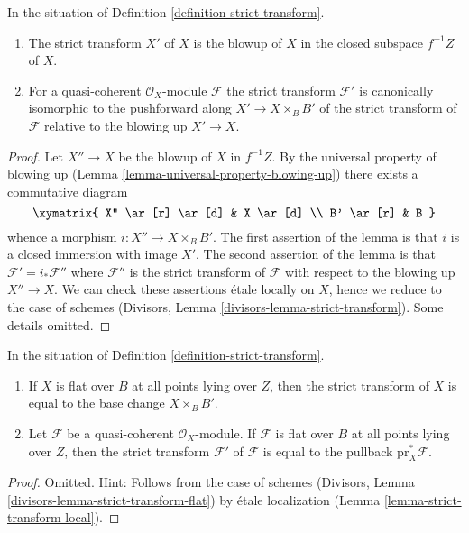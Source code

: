 \begin{lemma}
\label{lemma-strict-transform}
In the situation of Definition \ref{definition-strict-transform}.
\begin{enumerate}
\item The strict transform $X'$ of $X$ is the blowup of $X$ in the closed
subspace $f^{-1}Z$ of $X$.
\item For a quasi-coherent $\mathcal{O}_X$-module $\mathcal{F}$ the
strict transform $\mathcal{F}'$ is canonically isomorphic to
the pushforward along $X' \to X \times_B B'$ of the strict transform of
$\mathcal{F}$ relative to the blowing up $X' \to X$.
\end{enumerate}
\end{lemma}

\begin{proof}
Let $X'' \to X$ be the blowup of $X$ in $f^{-1}Z$. By the universal
property of blowing up (Lemma \ref{lemma-universal-property-blowing-up})
there exists a commutative diagram
$$
\xymatrix{
X'' \ar[r] \ar[d] & X \ar[d] \\
B' \ar[r] & B
}
$$
whence a morphism $i : X'' \to X \times_B B'$. The first assertion
of the lemma is that $i$ is a closed immersion with image $X'$.
The second assertion of the lemma is that $\mathcal{F}' = i_*\mathcal{F}''$
where $\mathcal{F}''$ is the strict transform of $\mathcal{F}$ with
respect to the blowing up $X'' \to X$. We can check these assertions
\'etale locally on $X$, hence we reduce to the case of schemes
(Divisors, Lemma \ref{divisors-lemma-strict-transform}).
Some details omitted.
\end{proof}

\begin{lemma}
\label{lemma-strict-transform-flat}
In the situation of Definition \ref{definition-strict-transform}.
\begin{enumerate}
\item If $X$ is flat over $B$ at all points lying over $Z$, then
the strict transform of $X$ is equal to the base change $X \times_B B'$.
\item Let $\mathcal{F}$ be a quasi-coherent $\mathcal{O}_X$-module.
If $\mathcal{F}$ is flat over $B$ at all points lying over $Z$, then
the strict transform $\mathcal{F}'$ of $\mathcal{F}$ is equal to the
pullback $\text{pr}_X^*\mathcal{F}$.
\end{enumerate}
\end{lemma}

\begin{proof}
Omitted. Hint: Follows from the case of schemes
(Divisors, Lemma \ref{divisors-lemma-strict-transform-flat})
by \'etale localization
(Lemma \ref{lemma-strict-transform-local}).
\end{proof}

